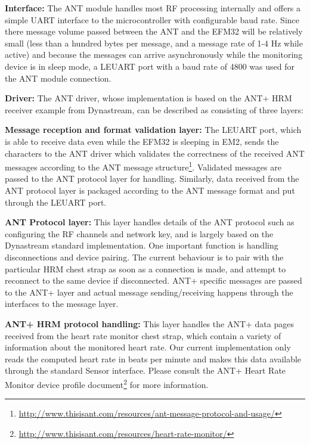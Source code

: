 \textbf{Interface:}
The ANT module handles most RF processing internally and offers a simple UART interface to the microcontroller with configurable baud rate. Since there message volume passed between the ANT and the EFM32 will be relatively small (less than a hundred bytes per message, and a message rate of 1-4 Hz while active) and because the messages can arrive asynchronously while the monitoring device is in sleep mode, a LEUART port with a baud rate of 4800 was used for the ANT module connection.


\textbf{Driver:}
The ANT driver, whose implementation is based on the ANT+ HRM receiver example from Dynastream, can be described as consisting of three layers:

\begin{description}
\item{\bfseries Message reception and format validation layer:} 
The LEUART port, which is able to receive data even while the EFM32 is sleeping in EM2, sends the characters to the ANT driver which validates the correctness of the received ANT messages according to the ANT message structure\footnote{\url{ http://www.thisisant.com/resources/ant-message-protocol-and-usage/}}.  Validated messages are passed to the ANT protocol layer for handling. Similarly, data received from the ANT protocol layer is packaged according to the ANT message format and put through the LEUART port.

\item{\bfseries ANT Protocol layer:}
This layer handles details of the ANT protocol such as configuring the RF channels and network key, and is largely based on the Dynastream standard  implementation. One important function is handling disconnections and device pairing. The current behaviour is to pair with the particular HRM chest strap as soon as a connection is made, and attempt to reconnect to the same device if disconnected. ANT+ specific messages are passed to the ANT+ layer and actual message sending/receiving happens through the interfaces to the message layer.

\item{\bfseries ANT+ HRM protocol handling:}
This layer handles the ANT+ data pages received from the heart rate monitor chest strap, which contain a variety of information about the monitored heart rate. Our current implementation only reads the computed heart rate in beats per minute and makes this data available through the standard Sensor interface. Please consult the ANT+ Heart Rate Monitor device profile document\footnote{\url{http://www.thisisant.com/resources/heart-rate-monitor/}} for more information.
\end{description}


